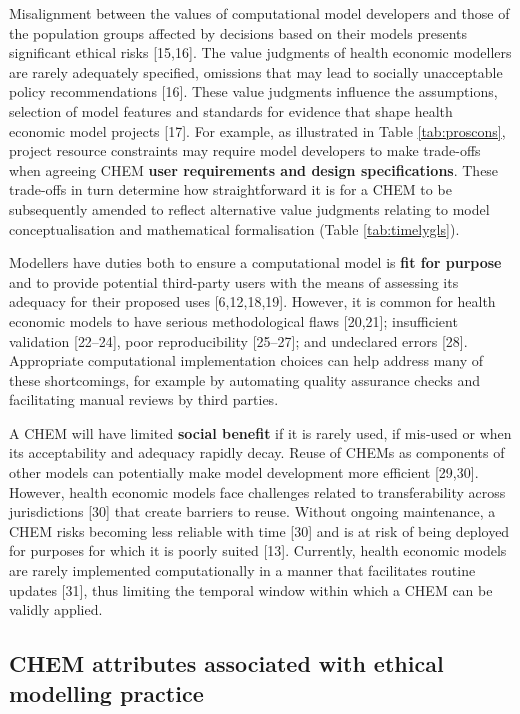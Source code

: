 \documentclass[
]{article}
\begin{document}
Misalignment between the values of computational model developers and those of the population groups affected by decisions based on their models presents significant ethical risks {[}15,16{]}. The value judgments of health economic modellers are rarely adequately specified, omissions that may lead to socially unacceptable policy recommendations {[}16{]}. These value judgments influence the assumptions, selection of model features and standards for evidence that shape health economic model projects {[}17{]}. For example, as illustrated in Table \ref{tab:proscons}, project resource constraints may require model developers to make trade-offs when agreeing CHEM \textbf{user requirements and design specifications}. These trade-offs in turn determine how straightforward it is for a CHEM to be subsequently amended to reflect alternative value judgments relating to model conceptualisation and mathematical formalisation (Table \ref{tab:timelygls}).

Modellers have duties both to ensure a computational model is \textbf{fit for purpose} and to provide potential third-party users with the means of assessing its adequacy for their proposed uses {[}6,12,18,19{]}. However, it is common for health economic models to have serious methodological flaws {[}20,21{]}; insufficient validation {[}22--24{]}, poor reproducibility {[}25--27{]}; and undeclared errors {[}28{]}. Appropriate computational implementation choices can help address many of these shortcomings, for example by automating quality assurance checks and facilitating manual reviews by third parties.

A CHEM will have limited \textbf{social benefit} if it is rarely used, if mis-used or when its acceptability and adequacy rapidly decay. Reuse of CHEMs as components of other models can potentially make model development more efficient {[}29,30{]}. However, health economic models face challenges related to transferability across jurisdictions {[}30{]} that create barriers to reuse. Without ongoing maintenance, a CHEM risks becoming less reliable with time {[}30{]} and is at risk of being deployed for purposes for which it is poorly suited {[}13{]}. Currently, health economic models are rarely implemented computationally in a manner that facilitates routine updates {[}31{]}, thus limiting the temporal window within which a CHEM can be validly applied.

\hypertarget{chem-attributes-associated-with-ethical-modelling-practice}{%
\subsection{CHEM attributes associated with ethical modelling practice}\label{chem-attributes-associated-with-ethical-modelling-practice}}
\end{document}
